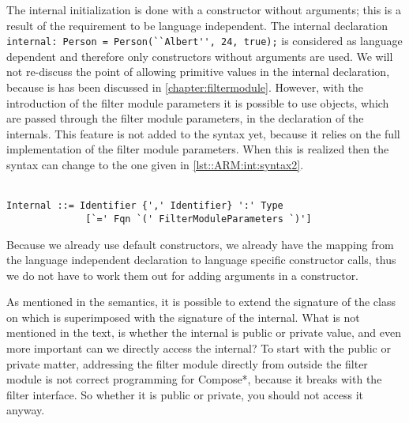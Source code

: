 The internal initialization is done with a constructor without arguments; this is a result of the requirement to be language independent. 
The internal declaration \lstinline!internal: Person = Person(``Albert'', 24, true);! is considered as language dependent and therefore only constructors without arguments are used. 
We will not re-discuss the point of allowing primitive values in the internal declaration, because is has been discussed in \autoref{chapter:filtermodule}.
However, with the introduction of the filter module parameters it is possible to use objects, which are passed through the filter module parameters, in the declaration of the internals.
This feature is not added to the syntax yet, because it relies on the full implementation of the filter module parameters. 
When this is realized then the syntax can change to the one given in \autoref{lst::ARM:int:syntax2}.
\\\\
\begin{lstlisting}[caption = {Proposed internal syntax}, label = lst::ARM:int:syntax2,
style = listing, language = ebnf]
Internal ::= Identifier {',' Identifier} ':' Type 
              [`=' Fqn `(' FilterModuleParameters `)']
\end{lstlisting}
Because we already use default constructors, we already have the mapping from the language independent declaration to language specific constructor calls, thus we do not have to work them out for adding arguments in a constructor.

As mentioned in the semantics, it is possible to extend the signature of the class on which is superimposed with the signature of the internal. 
What is not mentioned in the text, is whether the internal is public or private value, and even more important can we directly access the internal?
To start with the public or private matter, addressing the filter module directly from outside the filter module is not correct programming for Compose*, because it breaks with the filter interface. 
So whether it is public or private, you should not access it anyway.

